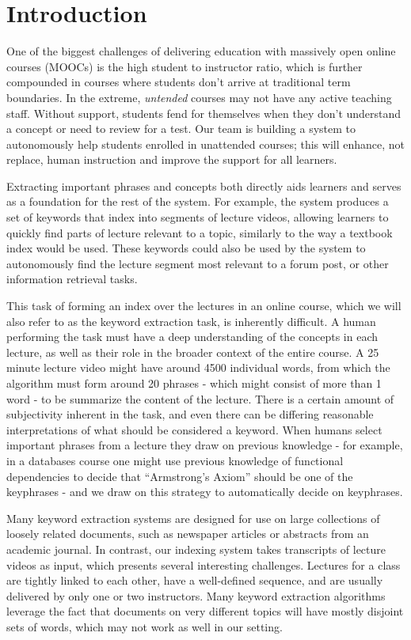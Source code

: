 \section{Introduction}
\label{sec:intro}

One of the biggest challenges of delivering education with massively open online courses (MOOCs) is the high student to instructor ratio, which is further compounded in courses where students don't arrive at traditional term boundaries. In the extreme, \textit{untended} courses may not have any active teaching staff. Without support, students fend for themselves when they don't understand a concept or need to review for a test. Our team is building a system to autonomously help students enrolled in unattended courses; this will enhance, not replace, human instruction and improve the support for all learners.

Extracting important phrases and concepts both directly aids learners and serves as a foundation for the rest of the system. For example, the system produces a set of keywords that index into segments of lecture videos, allowing learners to quickly find parts of lecture relevant to a topic, similarly to the way a textbook index would be used. These keywords could also be used by the system to autonomously find the lecture segment most relevant to a forum post, or other information retrieval tasks.

This task of forming an index over the lectures in an online course, which we will also refer to as the keyword extraction task, is inherently difficult. A human performing the task must have a deep understanding of the concepts in each lecture, as well as their role in the broader context of the entire course. A 25 minute lecture video might have around 4500 individual words, from which the algorithm must form around 20 phrases - which might consist of more than 1 word - to be summarize the content of the lecture. There is a certain amount of subjectivity inherent in the task, and even there can be differing reasonable interpretations of what should be considered a keyword. When humans select important phrases from a lecture they draw on previous knowledge - for example, in a databases course one might use previous knowledge of functional dependencies to decide that ``Armstrong's Axiom'' should be one of the keyphrases - and we draw on this strategy to automatically decide on keyphrases.

Many keyword extraction systems are designed for use on large collections of loosely related documents, such as newspaper articles or abstracts from an academic journal. In contrast, our indexing system takes transcripts of lecture videos as input, which presents several interesting challenges. Lectures for a class are tightly linked to each other, have a well-defined sequence, and are usually delivered by only one or two instructors. Many keyword extraction algorithms leverage the fact that documents on very different topics will have mostly disjoint sets of words, which may not work as well in our setting.

